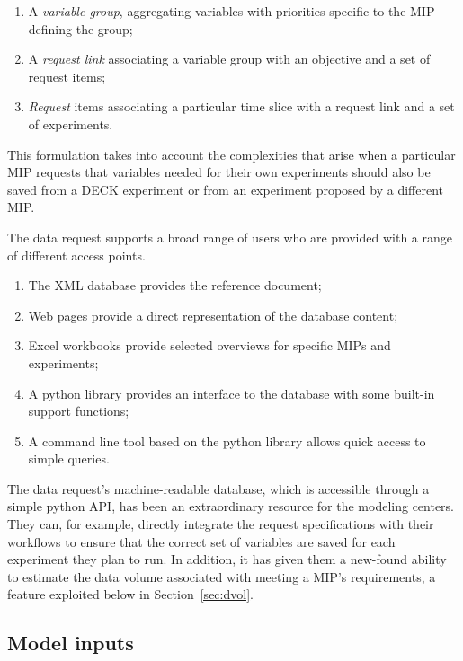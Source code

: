 \documentclass[gmd,manuscript]{copernicus}
\newcommand{\secref}[1] {\mbox{Section  \ref{sec:#1}}}
\begin{document}
\begin{enumerate}
\item A \emph{variable group}, aggregating variables with priorities
  specific to the MIP defining the group;
\item A \emph{request link} associating a variable group with an
  objective and a set of request items;
\item \emph{Request} items associating a particular time slice with a
  request link and a set of experiments.
\end{enumerate}

This formulation takes into account the complexities that arise  
when a particular MIP requests that variables needed for
their own experiments should also
be saved from a DECK experiment or from  an experiment proposed 
by a different MIP.

The data request supports a broad range of users who are 
provided with a range of different access points.

\begin{enumerate}
\item The XML database provides the reference document;
\item Web pages provide a direct representation of the database
  content;
\item Excel workbooks provide selected overviews for specific MIPs and
  experiments;
\item A python library provides an interface to the database with some
  built-in support functions;
\item A command line tool based on the python library allows quick
  access to simple queries.
\end{enumerate}

The data request's machine-readable database, which is accessible
through a simple python API, has been an extraordinary resource for
the modeling centers. They can, for example, directly integrate the
request specifications with their workflows to ensure that the correct
set of variables are saved for each experiment they plan to run. In
addition, it has given them a new-found ability to estimate the data
volume associated with meeting a MIP's requirements, a feature
exploited below in \secref{dvol}.

\subsection{Model inputs}
\label{sec:data-inputs}
\end{document}
